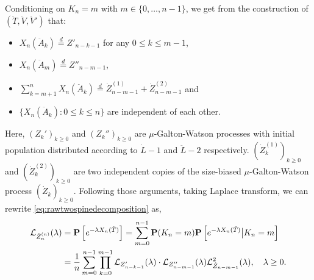 \documentclass[12pt]{amsart}
\numberwithin{equation}{section}
\newcommand{\prob}{\mathbf P}
\newcommand{\brac}[1]{\left[ #1 \right]}
\newcommand{\eqlaw}{\overset{d}{=}}
\begin{document}
	Conditioning on $K_n=m$ with
	$m\in\{0,\dots,n-1\}$,
	we get from the construction of $(\ddot T,\ddot V,\ddot V')$ that:
\begin{itemize}
\item
        $X_n(\ddot A_k)\eqlaw Z'_{n-k-1}$ for any $0\le k\le m-1$,
\item
    $X_n(\ddot A_m)\eqlaw Z''_{n-m-1}$,
\item
    $\sum_{k=m+1}^nX_n(\ddot A_k)\eqlaw \dot Z_{n-m-1}^{(1)}+\dot Z_{n-m-1}^{(2)}$ and
\item
      $\{X_n(\ddot A_k):0\le k\le n\}$
    are independent of each other.
\end{itemize}
	Here, $(Z_k')_{k\ge 0}$ and $(Z_k'')_{k\ge 0}$ are $\mu$-Galton-Watson processes with initial population distributed according to $\dot L-1$ and $\ddot L-2$ respectively. $(\dot Z_k^{(1)})_{k\ge 0}$ and $(\dot Z_k^{(2)})_{k\ge 0}$ are two independent copies of the size-biased $\mu$-Galton-Watson process $(\dot Z_k)_{k\ge 0}$.
	Following those arguments, taking Laplace transform, we can rewrite \eqref{eq:rawtwospinedecomposition} as,
\begin{equation}
\label{eq:laplacetransformationoftwospinedecomposition}
\begin{split}
		\cL_{\ddot Z_n^{(n)}}(\lambda)
	&=
		\prob\brac{e^{-\lambda X_n(\ddot T)}}
	=
	     \sum_{m=0}^{n-1}\prob(K_n=m)\prob\brac{e^{-\lambda X_n(\ddot T)}\big| K_n=m}
	\\&=
        \frac{1}{n}\sum_{m=0}^{n-1}\prod_{k=0}^{m-1}\cL_{Z'_{n-k-1}}(\lambda)
    \cdot
        \cL_{Z''_{n-m-1}}(\lambda)\cL_{\dot Z_{n-m-1}}^2(\lambda)
    ,\quad\lambda\geq 0.
\end{split}
\end{equation}
\medskip
\end{document}
